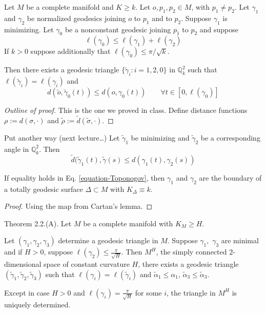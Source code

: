 \begin{theorem}
\label{theorem-Toponogov-metric}
Let $M$ be a complete manifold and $K \geq k$. Let $o,p_1,p_2 \in M$, with
$p_1\neq  p_2$. Let $\gamma_1$ and $\gamma_2$ be normalized geodesics joining 
$o$ to $p_1$ and to $p_2$. Suppose $\gamma_1$ is minimizing.
Let $\gamma_0$ be a nonconstant geodesic joining $p_1$ to $p_2$ and suppose
$$
\ell(\gamma_0) \leq \ell(\gamma_1) +\ell(\gamma_2)
$$
If $k>0$ suppose additionally that $\ell(\gamma_0) \leq \pi/\sqrt{k}$.

Then there exists a geodesic triangle $\{\tilde{\gamma}_i:i=1,2,0\}$ in
$\mathbb{Q}_k^2$ such that $\ell(\tilde{\gamma}_i) = \ell(\gamma_i)$ and
$$
d(\tilde{o},\tilde{\gamma}_0(t)) \leq  d(o,\gamma_0(t))\qquad \forall t \in
[0,\ell(\gamma_0)]
$$
\end{theorem}

\begin{proof}[Outline of proof]
This is the one we proved in class. Define distance functions
$\rho:=d(\sigma,\cdot)$ and $\tilde{\rho}:=\tilde{d}(\tilde{\sigma},\cdot)$.
\end{proof}

\begin{theorem}
\label{theorem-Toponogov-hinge-2}
Put another way (next lecture…) Let $\tilde{\gamma}_1$ be minimizing 
and $\tilde{\gamma}_2$ 
be a corresponding angle in $\mathbb{Q}_k^2$. Then
$$
\tilde{d}(\tilde{\gamma}_1(t),\tilde{\gamma}(s)\leq d(\gamma_1(t),\gamma_2(s))
$$
\end{theorem}

\begin{lemma}
\label{lemma-equality-Toponogov}
If equality holds in Eq. \ref{equation-Toponogov}, then $\gamma_1$ and
$\gamma_2$ are the boundary of a totally geodesic surface $\Delta \subset M$ 
with $K_\Delta \equiv k$.
\end{lemma}

\begin{proof}
Using the map from Cartan's lemma.
\end{proof}

\begin{theorem}
\label{theorem-Toponogov-angle}
\cite{Cheeger-Ebin} Theorem 2.2.(A). Let $M$ be a complete manifold with 
$K_M\geq H$.

Let $(\gamma_1,\gamma_2,\gamma_3)$ determine a geodesic triangle in $M$. Suppose
$\gamma_1,$ $\gamma_3$ are minimal and if $H>0$, suppose $\ell(\gamma_2)\leq
\frac{\pi}{\sqrt{H}}$. Then $M^H$, the simply connected 2-dimensional space of
constant curvature $H$, there exists a geodesic triangle
$(\tilde{\gamma}_1,\tilde{\gamma}_2,\tilde{\gamma}_3)$ such that
$\ell(\gamma_i)=\ell(\tilde{\gamma}_i)$ and $\tilde{\alpha}_1 \leq\alpha_1$,
$\tilde{\alpha}_3 \leq \tilde{\alpha}_3$.

Except in case $H>0$ and $\ell(\gamma_i)=\frac{\pi}{\sqrt{H}}$ for some $i$, the
triangle in $M^H$ is uniquely determined.
\end{theorem}

